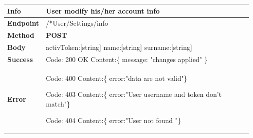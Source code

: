 \begin{table}[H]
\begin{tabular}{|l|p{}|}
\hline
\textbf{Info}             & User modify his/her account info                                                                      \\ \hline
\textbf{Endpoint}    &  /*User/Settings/info\\ \hline
\textbf{Method}         &   \textbf{POST}                                                                            \\ \hline

\textbf{Body}  &     activToken:[string] \newline
                   name:[string]\newline
                   surname:[string]\newline
              
                    \\ \hline
                    
\textbf{Success} &  Code: 200 OK \newline
                    Content:\{\newline 
                    message: "changes applied"\newline 
                    \}\\ \hline
\textbf{Error} &  Code: 400 \newline
                  Content:\{\newline
                  error:"data are not valid"\newline\}\newline
                  
                  Code: 403 \newline
                  Content:\{\newline
                  error:"User username and token don't match"\newline\}\newline
                  
                  Code: 404 \newline
                  Content:\{\newline
                  error:"User not found "\newline\}\\\hline

\end{tabular}
\end{table}




